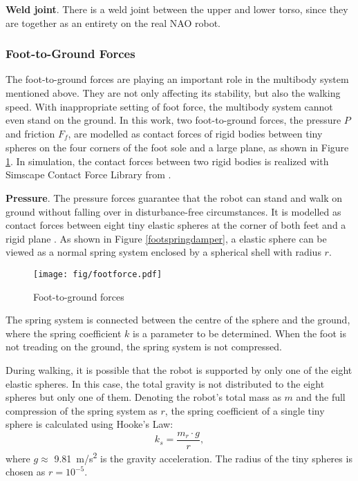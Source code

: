 \textbf{Weld joint}.
There is a weld joint between the upper and lower torso, since they are together as an entirety on the real NAO robot.



\subsubsection{Foot-to-Ground Forces}
The foot-to-ground forces are playing an important role in the multibody system mentioned above. They are not only affecting its stability, but also the walking speed. With inappropriate setting of foot force, the multibody system cannot even stand on the ground. In this work, two foot-to-ground forces, the pressure $ \mathit{P} $ and friction $ \mathit{F_f} $, are modelled as contact forces of rigid bodies between tiny spheres on the four corners of the foot sole and a large plane, as shown in Figure {\ref{footforces}}. In simulation, the contact forces between two rigid bodies is realized with Simscape Contact Force Library from \cite{miller2018}.

\textbf{Pressure}. The pressure forces guarantee that the robot can stand and walk on ground without falling over in disturbance-free circumstances.
It is modelled as contact forces between eight tiny elastic spheres at the corner of both feet and a rigid plane \cite{guler1998viscoelastic}. As shown in Figure {\ref{footspringdamper}}, a elastic sphere can be viewed as a normal spring system enclosed by a spherical shell with radius $ r $. 
\begin{figure}[H]
	\centering
	\texttt{[image: fig/footforce.pdf]}
	\caption{Foot-to-ground forces}
	\label{footforces}
\end{figure}

The spring system is connected between the centre of the sphere and the ground, where the spring coefficient $ k $ is a parameter to be determined. When the foot is not treading on the ground, the spring system is not compressed.

During walking, it is possible that the robot is supported by only one of the eight elastic spheres. In this case, the total gravity is not distributed to the eight spheres but only one of them. Denoting the robot's total mass as $ m $ and the full compression of the spring system as $ r $, the spring coefficient of a single tiny sphere is calculated using Hooke's Law:
\begin{equation}
k_s = \frac{m_r\cdot g}{r},
\end{equation}
where $ g \approx$ \SI{9.81}{m/s^2} is the gravity acceleration. The radius of the tiny spheres is chosen as $ r = 10^{-5} $.


